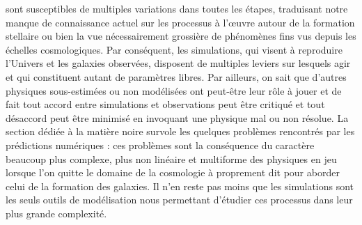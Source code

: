  sont susceptibles de multiples variations dans toutes les étapes, traduisant notre manque de connaissance actuel sur les processus à l'œuvre autour de la formation stellaire ou bien la vue nécessairement grossière de phénomènes fins vus depuis les échelles cosmologiques. Par conséquent, les simulations, qui visent à reproduire l'Univers et les galaxies observées, disposent de multiples leviers sur lesquels agir et qui constituent autant de paramètres libres. Par ailleurs, on sait que d'autres physiques sous-estimées ou non modélisées ont peut-être leur rôle à jouer et de fait tout accord entre simulations et observations peut être critiqué et tout désaccord peut être minimisé en invoquant une physique mal ou non résolue. La section dédiée à la matière noire survole les quelques problèmes rencontrés par les prédictions numériques : ces problèmes sont la conséquence du caractère beaucoup plus complexe, plus non linéaire et multiforme des physiques en jeu lorsque l'on quitte le domaine de la cosmologie à proprement dit pour aborder celui de la formation des galaxies. Il n'en reste pas moins que les simulations sont les seuls outils de modélisation nous permettant d'étudier ces processus dans leur plus grande complexité.
